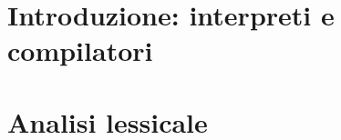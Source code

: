 \documentclass{article}
\begin{document}
\newgeometry{}

\tableofcontents
\restoregeometry

\section{Introduzione: interpreti e compilatori}


\section{Analisi lessicale}

\end{document}
